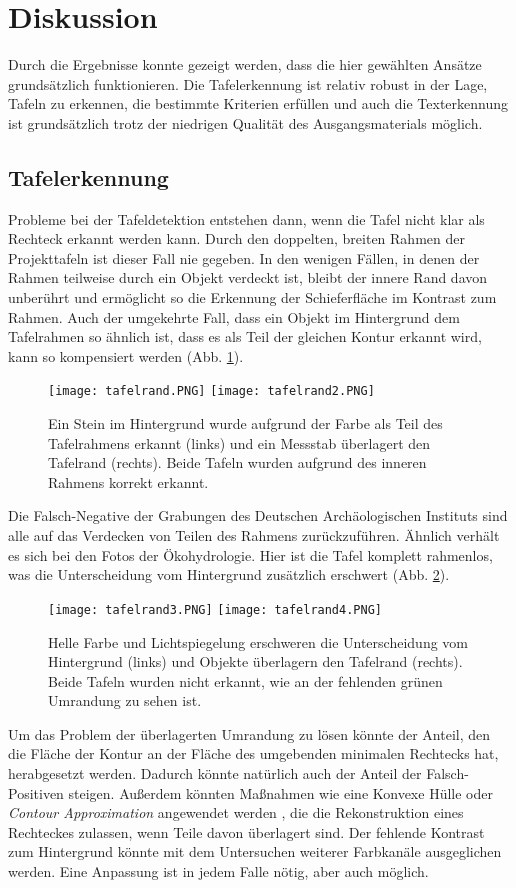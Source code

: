 \section{Diskussion}

Durch die Ergebnisse konnte gezeigt werden, dass die hier gewählten Ansätze grundsätzlich funktionieren. Die Tafelerkennung ist relativ robust in der Lage, Tafeln zu erkennen, die bestimmte Kriterien erfüllen und auch die Texterkennung ist grundsätzlich trotz der niedrigen Qualität des Ausgangsmaterials möglich.
\subsection{Tafelerkennung}
Probleme bei der Tafeldetektion entstehen dann, wenn die Tafel nicht klar als Rechteck erkannt werden kann. Durch den doppelten, breiten Rahmen der Projekttafeln ist dieser Fall nie gegeben. In den wenigen Fällen, in denen der Rahmen teilweise durch ein Objekt verdeckt ist, bleibt der innere Rand davon unberührt und ermöglicht so die Erkennung der Schieferfläche im Kontrast zum Rahmen. Auch der umgekehrte Fall, dass ein Objekt im Hintergrund dem Tafelrahmen so ähnlich ist, dass es als Teil der gleichen Kontur erkannt wird, kann so kompensiert werden (Abb. \ref{fig:tafelrand}).
\begin{figure}[h!]
\texttt{[image: tafelrand.PNG]}
\texttt{[image: tafelrand2.PNG]}
\caption{Ein Stein im Hintergrund wurde aufgrund der Farbe als Teil des Tafelrahmens erkannt (links) und ein Messstab überlagert den Tafelrand (rechts). Beide Tafeln wurden aufgrund des inneren Rahmens korrekt erkannt.}
\label{fig:tafelrand}
\end{figure}
Die Falsch-Negative der Grabungen des Deutschen Archäologischen Instituts sind alle auf das Verdecken von Teilen des Rahmens zurückzuführen. Ähnlich verhält es sich bei den Fotos der Ökohydrologie. Hier ist die Tafel komplett rahmenlos, was die Unterscheidung vom Hintergrund zusätzlich erschwert (Abb. \ref{fig:tafelrand2}).
\begin{figure}[h!]
\texttt{[image: tafelrand3.PNG]}
\texttt{[image: tafelrand4.PNG]}
\caption{Helle Farbe und Lichtspiegelung erschweren die Unterscheidung vom Hintergrund (links) und Objekte überlagern den Tafelrand (rechts). Beide Tafeln wurden nicht erkannt, wie an der fehlenden grünen Umrandung zu sehen ist.}
\label{fig:tafelrand2}
\end{figure}
Um das Problem der überlagerten Umrandung zu lösen könnte der Anteil, den die Fläche der Kontur an der Fläche des umgebenden minimalen Rechtecks hat, herabgesetzt werden. Dadurch könnte natürlich auch der Anteil der Falsch-Positiven steigen. Außerdem könnten Maßnahmen wie eine Konvexe Hülle oder \textit{Contour Approximation} angewendet werden \cite{opencvcontours}, die die Rekonstruktion eines Rechteckes zulassen, wenn Teile davon überlagert sind. Der fehlende Kontrast zum Hintergrund könnte mit dem Untersuchen weiterer Farbkanäle ausgeglichen werden. Eine Anpassung ist in jedem Falle nötig, aber auch möglich.
